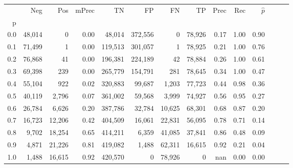 \begin{tabular}{rrrrrrrrrrrrrr}
\toprule
{} &     Neg &     Pos & mPrec &       TN &       FP &      FN &      TP &  Prec &   Rec & $\hat{p}$ \\
p   &         &         &       &          &          &         &         &       &       &           \\
\midrule
0.0 &  48,014 &       0 &  0.00 &   48,014 &  372,556 &       0 &  78,926 &  0.17 &  1.00 &      0.90 \\
0.1 &  71,499 &       1 &  0.00 &  119,513 &  301,057 &       1 &  78,925 &  0.21 &  1.00 &      0.76 \\
0.2 &  76,868 &      41 &  0.00 &  196,381 &  224,189 &      42 &  78,884 &  0.26 &  1.00 &      0.61 \\
0.3 &  69,398 &     239 &  0.00 &  265,779 &  154,791 &     281 &  78,645 &  0.34 &  1.00 &      0.47 \\
0.4 &  55,104 &     922 &  0.02 &  320,883 &   99,687 &   1,203 &  77,723 &  0.44 &  0.98 &      0.36 \\
0.5 &  40,119 &   2,796 &  0.07 &  361,002 &   59,568 &   3,999 &  74,927 &  0.56 &  0.95 &      0.27 \\
0.6 &  26,784 &   6,626 &  0.20 &  387,786 &   32,784 &  10,625 &  68,301 &  0.68 &  0.87 &      0.20 \\
0.7 &  16,723 &  12,206 &  0.42 &  404,509 &   16,061 &  22,831 &  56,095 &  0.78 &  0.71 &      0.14 \\
0.8 &   9,702 &  18,254 &  0.65 &  414,211 &    6,359 &  41,085 &  37,841 &  0.86 &  0.48 &      0.09 \\
0.9 &   4,871 &  21,226 &  0.81 &  419,082 &    1,488 &  62,311 &  16,615 &  0.92 &  0.21 &      0.04 \\
1.0 &   1,488 &  16,615 &  0.92 &  420,570 &        0 &  78,926 &       0 &   nan &  0.00 &      0.00 \\
\bottomrule
\end{tabular}
